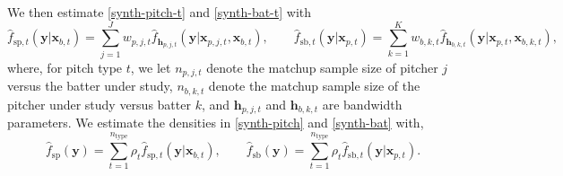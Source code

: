 \documentclass[12pt]{article}
\newcommand{\y}{\textbf{y}}
\newcommand{\x}{\textbf{x}}
\newcommand{\h}{\textbf{h}}
\begin{document}
We then estimate \eqref{synth-pitch-t} and \eqref{synth-bat-t} with
\begin{equation} \label{synth-est-t}
  \hat f_{\text{sp},t}(\y|\x_{b,t}) = \sum_{j=1}^J w_{p,j,t}\hat f_{\h_{p,j,t}}(\y|\x_{p,j,t},\x_{b,t}),
  \qquad
  \hat f_{\text{sb}, t}(\y|\x_{p,t}) = \sum_{k=1}^K w_{b,k,t}\hat f_{\h_{b,k,t}}(\y|\x_{p,t},\x_{b,k,t}),
\end{equation}
where, for pitch type $t$, we let $n_{p,j,t}$ denote the matchup sample size of pitcher $j$ versus the batter under study, $n_{b,k,t}$ denote the matchup sample size of the pitcher under study versus batter $k$, and $\h_{p,j,t}$ and $\h_{b,k,t}$ are bandwidth parameters. We estimate the densities in \eqref{synth-pitch} and \eqref{synth-bat} with,
\begin{equation} \label{synth-est}
  \hat f_{\text{sp}}(\y) =  \sum_{t=1}^{n_{\text{type}}} \rho_t \hat f_{\text{sp}, t}(\y|\x_{b,t}),
  \qquad
  \hat f_{\text{sb}}(\y) = \sum_{t=1}^{n_{\text{type}}} \rho_t
    \hat f_{\text{sb}, t}(\y|\x_{p,t}).
\end{equation}
\end{document}
